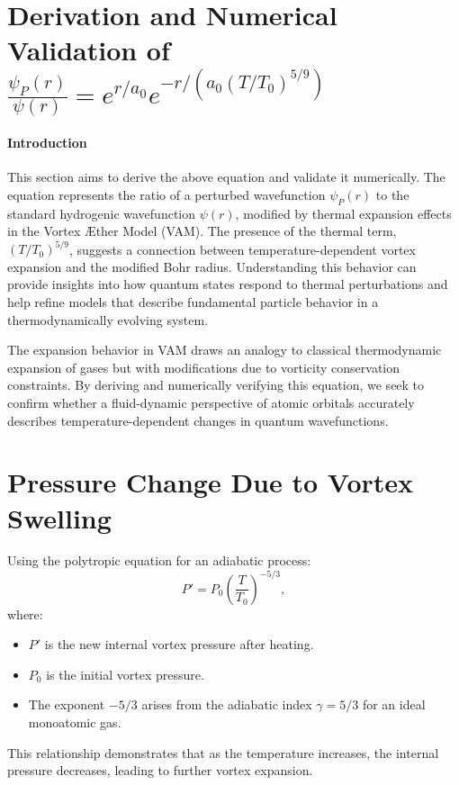 
  \section{Derivation and Numerical Validation of $\frac{\psi_P(r)}{\psi(r)} = e^{r/a_0} e^{-r / (a_0 (T/T_0)^{5/9})}$}

  \paragraph*{Introduction}
  This section aims to derive the above equation and validate it numerically. The equation represents the ratio of a perturbed wavefunction $\psi_P(r)$ to the standard hydrogenic wavefunction $\psi(r)$, modified by thermal expansion effects in the Vortex \AE ther Model (VAM). The presence of the thermal term, $(T/T_0)^{5/9}$, suggests a connection between temperature-dependent vortex expansion and the modified Bohr radius. Understanding this behavior can provide insights into how quantum states respond to thermal perturbations and help refine models that describe fundamental particle behavior in a thermodynamically evolving system.

  The expansion behavior in VAM draws an analogy to classical thermodynamic expansion of gases but with modifications due to vorticity conservation constraints. By deriving and numerically verifying this equation, we seek to confirm whether a fluid-dynamic perspective of atomic orbitals accurately describes temperature-dependent changes in quantum wavefunctions.

  \section{Pressure Change Due to Vortex Swelling}
  Using the polytropic equation for an adiabatic process:
  \begin{equation*}
    P' = P_0 \left( \frac{T}{T_0} \right)^{-5/3},
  \end{equation*}
  where:
  \begin{itemize}
    \item $P'$ is the new internal vortex pressure after heating.
    \item $P_0$ is the initial vortex pressure.
    \item The exponent $-5/3$ arises from the adiabatic index $\gamma = 5/3$ for an ideal monoatomic gas.
  \end{itemize}
  This relationship demonstrates that as the temperature increases, the internal pressure decreases, leading to further vortex expansion.

